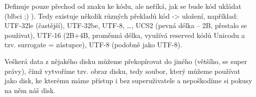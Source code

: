 \documentclass[12pt]{article}					%
\begin{document}
    \begin{definice}[Unicode]
        Definuje pouze přechod od znaku ke kódu, ale neříká, jak se bude kód ukládat (blbci ;) ). Tedy existuje několik různých překladů kód -> uložení, například: UTF-32le (častější), UTF-32be, UTF-8, …, UCS2 (pevná délka -- 2B, přestalo se použivat), UTF-16 (2B+4B, proměnná délka, využívá reserved kódů Unicodu a tzv. surrogate = zástupce), UTF-8 (podobně jako UTF-8).
    \end{definice}


    \begin{definice}
        Veškerá data z nějakého disku můžeme překopírovat do jiného (většího, se super právy), čímž vytvoříme tzv. obraz disku, tedy soubor, který můžeme používat jako disk, ke kterému máme přístup i bez superuživatele a nepoškodíme si pokusy na něm náš disk.
    \end{definice}
\end{document}
